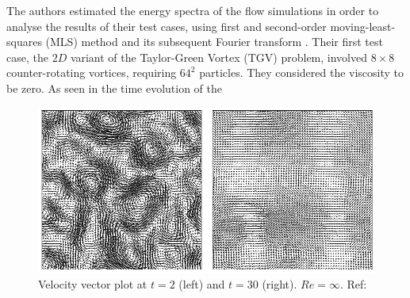 The authors estimated the energy spectra of the flow simulations in order to analyse the results of their test cases, using first and second-order moving-least-squares (MLS) method \parencite{gossler2001moving} and its subsequent Fourier transform \parencite{frigo2005design}.
Their first test case, the $2D$ variant of the Taylor-Green Vortex (TGV) problem, involved $8\times 8$ counter-rotating vortices, requiring $64^2$ particles. They considered the viscosity to be zero.
As seen in the time evolution of the 
\begin{figure}[h]
    \centering
    \includegraphics[scale=0.75]{Figures/research_papers/adami2012-evolution-vel-field-tgv.png}
    \caption{Velocity vector plot at $t=2$ (left) and $t=30$ (right). $Re = \infty$. Ref: \parencite{Adami2012} }
    \label{fig:adami2012-evolution-vel-field-tgv}
\end{figure}

